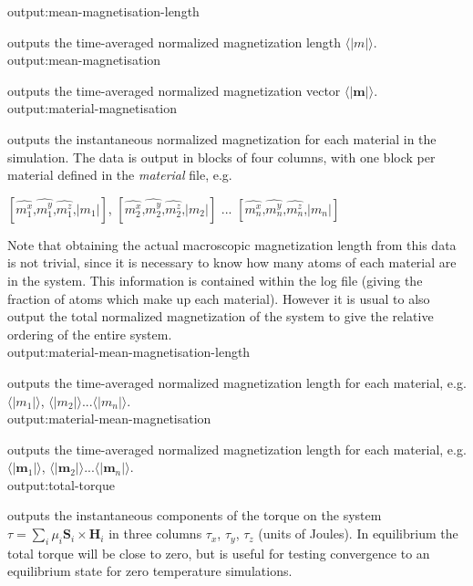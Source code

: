 {\zicf output:mean-magnetisation-length}
outputs the time-averaged normalized magnetization length $\langle|m|\rangle$.\\

{\zicf output:mean-magnetisation}
outputs the time-averaged normalized magnetization vector $\langle|\mathbf{m}|\rangle$.\\

{\zicf output:material-magnetisation}
outputs the instantaneous normalized magnetization for each material in the simulation.
The data is output in blocks of four columns, with one block per material defined in
the \textit{material} file, e.g.

\begin{center}
$\left[ \hat{m_1^x} \textrm{,} \hat{m_1^y} \textrm{,} \hat{m_1^z} \textrm{,} |m_1| \right]$,
$\left[ \hat{m_2^x} \textrm{,} \hat{m_2^y} \textrm{,} \hat{m_2^z} \textrm{,} |m_2| \right]$ ...
$\left[ \hat{m_n^x} \textrm{,} \hat{m_n^y} \textrm{,} \hat{m_n^z} \textrm{,} |m_n| \right]$
\end{center}

Note that obtaining the actual macroscopic magnetization length from this data is not trivial,
 since it is necessary to know how many atoms of each material are in the system. This
 information is contained within the log file (giving the fraction of atoms which make up
 each material). However it is usual to also output the total normalized magnetization of
 the system to give the relative ordering of the entire system.\\

{\zicf output:material-mean-magnetisation-length}
outputs the time-averaged normalized magnetization length for each material, e.g. $\langle|m_1|\rangle$, $\langle|m_2|\rangle$...$\langle|m_n|\rangle$.\\

{\zicf output:material-mean-magnetisation}
outputs the time-averaged normalized magnetization length for each material, e.g. $\langle|\mathbf{m}_1|\rangle$,
$\langle|\mathbf{m}_2|\rangle$...$\langle|\mathbf{m}_n|\rangle$.\\

{\zicf output:total-torque}
outputs the instantaneous components of the torque on the system $\tau = \sum_i
\mu_i \mathbf{S}_i \times \mathbf{H}_i$ in three columns $\tau_x$, $\tau_y$,
$\tau_z$ (units of Joules). In equilibrium the total torque will be close to zero,
but is useful for testing convergence to an equilibrium state for zero temperature simulations.\\

